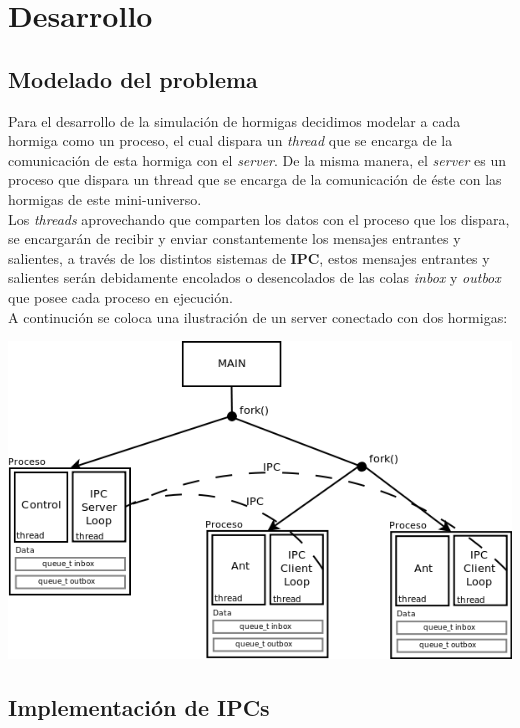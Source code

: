 \documentclass[a4paper,10pt]{article}
\begin{document}
\newpage

\section{Desarrollo}
\subsection{Modelado del problema}
Para el desarrollo de la simulación de hormigas decidimos modelar a cada hormiga como un proceso, el cual dispara un \textit{thread} que se
encarga de la comunicación de esta hormiga con el \textit{server}. De la misma manera, el \textit{server} es un proceso que dispara un thread
que se encarga de la comunicación de éste con las hormigas de este mini-universo.\\
Los \textit{threads} aprovechando que comparten los datos con el proceso que los dispara, se encargarán de recibir y enviar constantemente los 
mensajes entrantes y salientes, a través de los distintos sistemas de \textbf{IPC}, estos mensajes entrantes y salientes serán debidamente
encolados o desencolados de las colas \textit{inbox} y \textit{outbox} que posee cada proceso en ejecución.\\
A continución se coloca una ilustración de un server conectado con dos hormigas:

\begin{center}
 \includegraphics[scale=0.65]{./so1.png}
\end{center}

\subsection{Implementación de IPCs}
\end{document}
